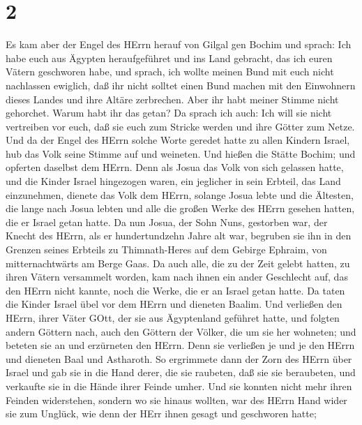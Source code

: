 \hypertarget{section-1}{%
\section{2}\label{section-1}}

 Es kam aber der Engel des HErrn herauf von Gilgal gen
Bochim und sprach: Ich habe euch aus Ägypten heraufgeführet und ins Land
gebracht, das ich euren Vätern geschworen habe, und sprach, ich wollte
meinen Bund mit euch nicht nachlassen ewiglich,  daß ihr
nicht solltet einen Bund machen mit den Einwohnern dieses Landes und
ihre Altäre zerbrechen. Aber ihr habt meiner Stimme nicht gehorchet.
Warum habt ihr das getan?  Da sprach ich auch: Ich will sie
nicht vertreiben vor euch, daß sie euch zum Stricke werden und ihre
Götter zum Netze.  Und da der Engel des HErrn solche Worte
geredet hatte zu allen Kindern Israel, hub das Volk seine Stimme auf und
weineten.  Und hießen die Stätte Bochim; und opferten
daselbst dem HErrn.  Denn als Josua das Volk von sich
gelassen hatte, und die Kinder Israel hingezogen waren, ein jeglicher in
sein Erbteil, das Land einzunehmen,  dienete das Volk dem
HErrn, solange Josua lebte und die Ältesten, die lange nach Josua lebten
und alle die großen Werke des HErrn gesehen hatten, die er Israel getan
hatte.  Da nun Josua, der Sohn Nuns, gestorben war, der
Knecht des HErrn, als er hundertundzehn Jahre alt war, 
begruben sie ihn in den Grenzen seines Erbteils zu Thimnath-Heres auf
dem Gebirge Ephraim, von mitternachtwärts am Berge Gaas. 
Da auch alle, die zu der Zeit gelebt hatten, zu ihren Vätern versammelt
worden, kam nach ihnen ein ander Geschlecht auf, das den HErrn nicht
kannte, noch die Werke, die er an Israel getan hatte.  Da
taten die Kinder Israel übel vor dem HErrn und dieneten Baalim.
 Und verließen den HErrn, ihrer Väter GOtt, der sie aus
Ägyptenland geführet hatte, und folgten andern Göttern nach, auch den
Göttern der Völker, die um sie her wohneten; und beteten sie an und
erzürneten den HErrn.  Denn sie verließen je und je den
HErrn und dieneten Baal und Astharoth.  So ergrimmete dann
der Zorn des HErrn über Israel und gab sie in die Hand derer, die sie
raubeten, daß sie sie beraubeten, und verkaufte sie in die Hände ihrer
Feinde umher. Und sie konnten nicht mehr ihren Feinden widerstehen,
 sondern wo sie hinaus wollten, war des HErrn Hand wider
sie zum Unglück, wie denn der HErr ihnen gesagt und geschworen hatte;
